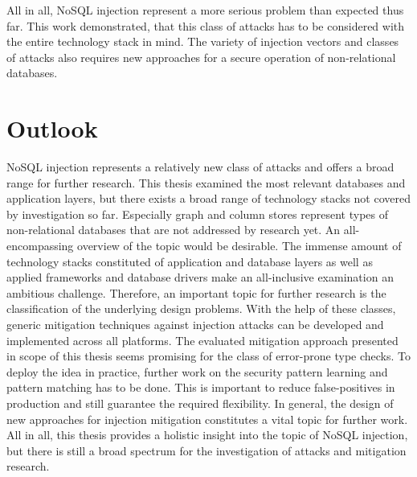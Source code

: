 All in all, NoSQL injection represent a more serious problem than expected thus far. This work demonstrated, that this class of attacks has to be considered with the entire technology stack in mind. The variety of injection vectors and classes of attacks also requires new approaches for a secure operation of non-relational databases. 

\section{Outlook}
NoSQL injection represents a relatively new class of attacks and offers a broad range for further research. This thesis examined the most relevant databases and application layers, but there exists a broad range of technology stacks not covered by investigation so far. Especially graph and column stores represent types of non-relational databases that are not addressed by research yet. An all-encompassing overview of the topic would be desirable. The immense amount of technology stacks constituted of application and database layers as well as applied frameworks and database drivers make an all-inclusive examination an ambitious challenge. Therefore, an important topic for further research is the classification of the underlying design problems. With the help of these classes, generic mitigation techniques against injection attacks can be developed and implemented across all platforms. The evaluated mitigation approach presented in scope of this thesis seems promising for the class of error-prone type checks. To deploy the idea in practice, further work on the security pattern learning and pattern matching has to be done. This is important to reduce false-positives in production and still guarantee the required flexibility. In general, the design of new approaches for injection mitigation constitutes a vital topic for further work. All in all, this thesis provides a holistic insight into the topic of NoSQL injection, but there is still a broad spectrum for the investigation of attacks and mitigation research. 
